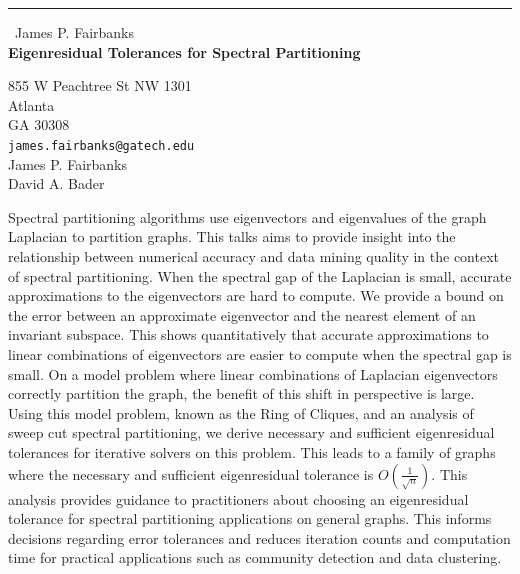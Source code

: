 \documentclass{report}
\begin{document}
\begin{center}
\rule{6in}{1pt} \
{\large James P. Fairbanks \\
{\bf Eigenresidual Tolerances for Spectral Partitioning}}

855 W Peachtree St NW 1301 \\ Atlanta \\ GA 30308
\\
{\tt james.fairbanks@gatech.edu}\\
James P. Fairbanks\\
David A. Bader\end{center}

Spectral partitioning algorithms use eigenvectors and eigenvalues of the
graph Laplacian to partition graphs. This talks aims to provide insight
into the relationship between numerical accuracy and data mining quality
in the context of spectral partitioning. When the spectral gap of the
Laplacian is small, accurate approximations to the eigenvectors are hard
to compute. We provide a bound on the error between an approximate
eigenvector and the nearest element of an invariant subspace.
This shows quantitatively that accurate approximations to linear
combinations of eigenvectors are easier to compute when the spectral gap
is small. On a model problem where linear combinations of Laplacian
eigenvectors correctly partition the graph, the benefit of this shift in
perspective is large. Using this model problem, known as the Ring of
Cliques, and an analysis of sweep cut spectral partitioning, we derive
necessary and sufficient eigenresidual tolerances for iterative solvers
on this problem. This leads to a family of graphs where the necessary and
sufficient eigenresidual tolerance is $O(\frac{1}{\sqrt{n}})$. This
analysis provides guidance to practitioners about choosing an
eigenresidual tolerance for spectral partitioning applications on general
graphs. This informs decisions regarding error tolerances and reduces
iteration counts and computation time for practical applications such as
community detection and data clustering.
\end{document}
